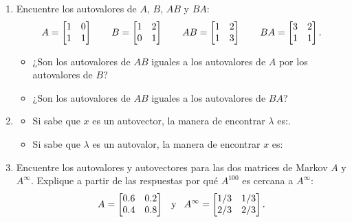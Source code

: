 \begin{enumerate}
\item Encuentre los autovalores de $A$, $B$, $AB$ y $BA$:
\[
\def\quad{\hskip .8em}
A=\begin{bmatrix} 1&0\\ 1&1\end{bmatrix}\qquad
B=\begin{bmatrix} 1&2\\ 0&1\end{bmatrix}\qquad
AB=\begin{bmatrix} 1&2\\ 1&3\end{bmatrix}\qquad
BA=\begin{bmatrix} 3&2\\ 1&1\end{bmatrix}. \]
\begin{itemize}
	\item [(a)] ¿Son los autovalores de $AB$ iguales a los autovalores de $A$ por los autovalores de $B$?
	\item [(b)] ¿Son los autovalores de $AB$ iguales a los autovalores de $BA$?
	\end{itemize}

\item
\begin{itemize}
\item[(a)] Si sabe que $ x$ es un autovector, la manera de encontrar $\lambda$ es:.
\item[(b)] Si sabe que $\lambda$ es un autovalor, la manera de encontrar  $x$ es:
\end{itemize}

\item Encuentre los autovalores y autovectores para las dos matrices de Markov $A$ y $A^\infty$. Explique a partir de las respuestas por qué $A^{100}$ es cercana a $A^\infty$:
%
$$
A=
\begin{bmatrix} 0.6&0.2\\ 0.4&0.8\end{bmatrix}
\quad \hbox{y} \quad
A^\infty=
\begin{bmatrix} 1/3&1/3\\ 2/3&2/3\end{bmatrix}.
$$


\end{enumerate}
